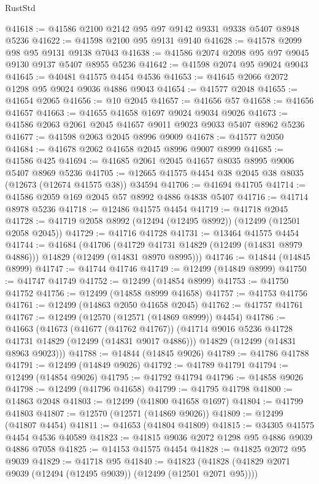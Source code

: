 \begin{lexlean}{RustStd}
\begin{coremodule}
{\begin{coremodule}
{{{{{{{{{{{{{{{{{{{{{{{{{{{{{{{{{{{{{{{{{{{{{{{{{{{{{{{{{{{{{{{{{{{{{{{{{{{{{{{{@41618 := @41586 @2100 @2142 @95 @97 @9142 @9331 @9338 @5407 @8948 @5236
@41622 := @41598 @2100 @95 @9131 @9140
@41628 := @41578 @2099 @98 @95 @9131 @9138 @7043
@41638 := @41586 @2074 @2098 @95 @97 @9045 @9130 @9137 @5407 @8955 @5236
@41642 := @41598 @2074 @95 @9024 @9043
@41645 := @40481 @41575 @4454 @4536
@41653 := @41645 @2066 @2072 @1298 @95 @9024 @9036 @4886 @9043
@41654 := @41577 @2048
@41655 := @41654 @2065
@41656 := @10 @2045
@41657 := @41656 @57
@41658 := @41656 @41657
@41663 := @41655 @41658 @1697 @9024 @9034 @9026
@41673 := @41586 @2063 @2061 @2045 @41657 @9011 @9023 @9033 @5407 @8962 @5236
@41677 := @41598 @2063 @2045 @8996 @9009
@41678 := @41577 @2050
@41684 := @41678 @2062 @41658 @2045 @8996 @9007 @8999
@41685 := @41586 @425
@41694 := @41685 @2061 @2045 @41657 @8035 @8995 @9006 @5407 @8969 @5236
@41705 := @12665 @41575 @4454 @38 @2045 @38 @8035 (@12673 (@12674 @41575 @38)) @34594
@41706 := @41694 @41705
@41714 := @41586 @2059 @169 @2045 @57 @8992 @4886 @4838 @5407
@41716 := @41714 @8978 @5236
@41718 := @12486 @41575 @4454
@41719 := @41718 @2045
@41728 := @41719 @2058 @8992 (@12494 (@12495 @8992)) (@12499 (@12501 @2058 @2045))
@41729 := @41716 @41728
@41731 := @13464 @41575 @4454
@41744 := @41684
    (@41706
      (@41729 @41731 @14829 (@12499 (@14831 @8979 @4886)))
      @14829
      (@12499 (@14831 @8970 @8995)))
@41746 := @14844 (@14845 @8999)
@41747 := @41744 @41746
@41749 := @12499 (@14849 @8999)
@41750 := @41747 @41749
@41752 := @12499 (@14854 @8999)
@41753 := @41750 @41752
@41756 := @12499 (@14858 @8999 @41658)
@41757 := @41753 @41756
@41761 := @12499 (@14863 @2050 @41658 @2045)
@41762 := @41757 @41761
@41767 := @12499 (@12570 (@12571 (@14869 @8999)) @4454)
@41786 := @41663
    (@41673
      (@41677 (@41762 @41767))
      (@41714 @9016 @5236 @41728 @41731 @14829 (@12499 (@14831 @9017 @4886)))
      @14829
      (@12499 (@14831 @8963 @9023)))
@41788 := @14844 (@14845 @9026)
@41789 := @41786 @41788
@41791 := @12499 (@14849 @9026)
@41792 := @41789 @41791
@41794 := @12499 (@14854 @9026)
@41795 := @41792 @41794
@41796 := @14858 @9026
@41798 := @12499 (@41796 @41658)
@41799 := @41795 @41798
@41800 := @14863 @2048
@41803 := @12499 (@41800 @41658 @1697)
@41804 := @41799 @41803
@41807 := @12570 (@12571 (@14869 @9026))
@41809 := @12499 (@41807 @4454)
@41811 := @41653 (@41804 @41809)
@41815 := @34305 @41575 @4454 @4536 @40589
@41823 := @41815 @9036 @2072 @1298 @95 @4886 @9039 @4886 @7058
@41825 := @14153 @41575 @4454
@41828 := @41825 @2072 @95 @9039
@41829 := @41718 @95
@41840 := @41823 (@41828 (@41829 @2071 @9039 (@12494 (@12495 @9039)) (@12499 (@12501 @2071 @95))))
}}}}}}}}}}}}}}}}}}}}}}}}}}}}}}}}}}}}}}}}}}}}}}}}}}}}}}}}}}}}}}}}}}}}}}}}}}}}}}}}
\end{coremodule}}
\end{coremodule}
\end{lexlean}
